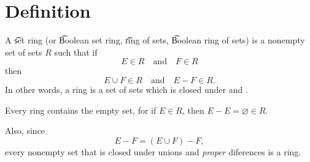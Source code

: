 

\section*{Definition}

A \t{set ring} (or \t{Boolean set ring}, \t{ring of sets}, \t{Boolean ring of sets}) is a nonempty set of sets $R$ such that if
    \[
E \in R \quad \text{and} \quad F \in R
    \]
then
    \[
E \cup F \in R \quad \text{and} \quad E - F \in R.
    \]
In other words, a ring is a set of sets which is closed under and .

Every ring contains the empty set, for if $E \in R$, then $E - E = \varnothing \in R$.

Also, since
    \[
E - F = (E \cup F) - F,
    \]
every nonempty set that is closed under unions and \textit{proper} diferences is a ring.

\blankpage